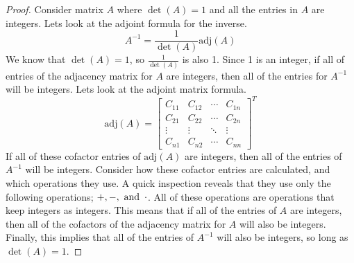 \documentclass{article}
\begin{document}
\begin{proof}
  Consider matrix $A$ where $\det(A) = 1$ and all the entries in $A$ are integers. Lets look at the adjoint formula for the inverse.
  \[
    A^{-1} = \frac{1}{\det(A)}\text{adj}(A)
  \]
  We know that $\det(A) = 1$, so $\frac{1}{\det(A)}$ is also 1. Since 1 is an integer, if all of entries of the adjacency matrix for $A$ are integers, then all of the entries for $A^{-1}$ will be integers. Lets look at the adjoint matrix formula.
  \[
    \text{adj}(A) = \begin{bmatrix}
      C_{11} & C_{12} & \cdots & C_{1n} \\
      C_{21} & C_{22} & \cdots & C_{2n} \\
      \vdots & \vdots & \ddots & \vdots \\
      C_{n1} & C_{n2} & \cdots & C_{nn}
    \end{bmatrix}^T
  \]
  If all of these cofactor entries of $\text{adj}(A)$ are integers, then all of the entries of $A^{-1}$ will be integers. Consider how these cofactor entries are calculated, and which operations they use. A quick inspection reveals that they use only the following operations; $+,-, \operatorname{~\text{and}~} \cdot$. All of these operations are operations that keep integers as integers. This means that if all of the entries of $A$ are integers, then all of the cofactors of the adjacency matrix for $A$ will also be integers. Finally, this implies that all of the entries of $A^{-1}$ will also be integers, so long as $\det(A) = 1$.
\end{proof}
\qdash
\end{document}
